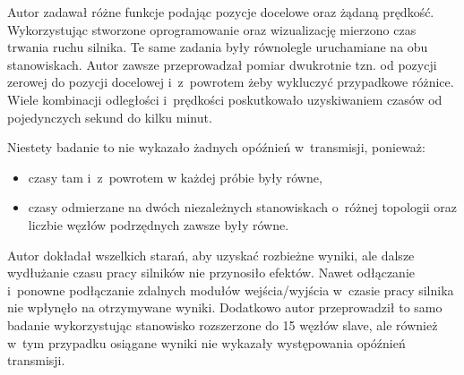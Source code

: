 Autor zadawał różne funkcje podając pozycje docelowe oraz żądaną prędkość. Wykorzystując stworzone oprogramowanie oraz wizualizację mierzono czas trwania ruchu silnika. Te same zadania były równolegle uruchamiane na obu stanowiskach. Autor zawsze przeprowadzał pomiar dwukrotnie tzn. od pozycji zerowej do pozycji docelowej i~z~powrotem żeby wykluczyć przypadkowe różnice. Wiele kombinacji odległości i~prędkości poskutkowało uzyskiwaniem czasów od pojedynczych sekund do kilku minut. 

\noindent Niestety badanie to nie wykazało żadnych opóźnień w~transmisji, ponieważ:
\begin{itemize}
\item czasy tam i~z~powrotem w każdej próbie były równe,
\item czasy odmierzane na dwóch niezależnych stanowiskach o~różnej topologii oraz liczbie węzłów podrzędnych zawsze były równe.
\end{itemize}

Autor dokładał wszelkich starań, aby uzyskać rozbieżne wyniki, ale dalsze wydłużanie czasu pracy silników nie przynosiło efektów. Nawet odłączanie i~ponowne podłączanie zdalnych modułów wejścia/wyjścia w~czasie pracy silnika nie wpłynęło na otrzymywane wyniki. Dodatkowo autor przeprowadził to samo badanie wykorzystując stanowisko rozszerzone do 15 węzłów slave, ale również w~tym przypadku osiągane wyniki nie wykazały występowania opóźnień transmisji.
%
%
%
%
